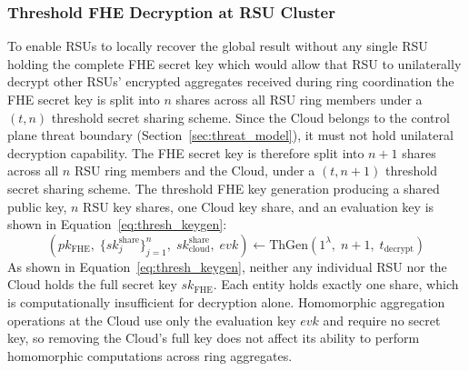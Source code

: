 \documentclass[12pt, a4paper]{report}
\begin{document}
\subsubsection{Threshold FHE Decryption at RSU Cluster}
\label{sec:thresh_fhe}

To enable RSUs to locally recover the global result without any single
RSU holding the complete FHE secret key which would allow that RSU
to unilaterally decrypt other RSUs' encrypted aggregates received during
ring coordination the FHE secret key is split into $n$ shares across
all RSU ring members under a $(t,n)$ threshold secret sharing scheme.
Since the Cloud belongs to the control plane threat boundary
(Section~\ref{sec:threat_model}), it must not hold unilateral
decryption capability. The FHE secret key is therefore split into
$n+1$ shares across all $n$ RSU ring members and the Cloud, under
a $(t, n+1)$ threshold secret sharing scheme. The threshold FHE key generation producing a shared public key,
$n$ RSU key shares, one Cloud key share, and an evaluation key
is shown in Equation~\eqref{eq:thresh_keygen}:
\begin{equation}
  \left(
    pk_{\mathrm{FHE}},\;
    \{sk_j^{\mathrm{share}}\}_{j=1}^{n},\;
    sk_{\mathrm{cloud}}^{\mathrm{share}},\;
    evk
  \right)
  \leftarrow \mathrm{ThGen}(1^{\lambda},\; n+1,\;
  t_{\mathrm{decrypt}})
  \label{eq:thresh_keygen}
\end{equation}
As shown in Equation~\eqref{eq:thresh_keygen}, neither any individual RSU nor the Cloud holds the full secret key $sk_{\mathrm{FHE}}$. Each entity holds exactly one share, which is computationally insufficient for decryption alone. Homomorphic aggregation operations at the Cloud use only the evaluation key $evk$ and require no secret key, so removing the Cloud's full key does not affect its ability to perform homomorphic computations across ring aggregates.
\end{document}
